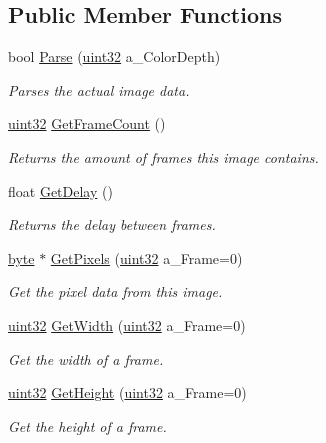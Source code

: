 \subsection*{Public Member Functions}
\begin{DoxyCompactItemize}
\item 
bool \hyperlink{classtil_1_1_image_g_i_f_a227eb60dcc93f3a9390ef3b5152d8dd4}{Parse} (\hyperlink{namespacetil_a20db61688ed403d11f057a508d87e54c}{uint32} a\_\-ColorDepth)
\begin{DoxyCompactList}\small\item\em Parses the actual image data. \item\end{DoxyCompactList}\item 
\hyperlink{namespacetil_a20db61688ed403d11f057a508d87e54c}{uint32} \hyperlink{classtil_1_1_image_g_i_f_a9e0c056b0263196d305c9102f254240e}{GetFrameCount} ()
\begin{DoxyCompactList}\small\item\em Returns the amount of frames this image contains. \item\end{DoxyCompactList}\item 
float \hyperlink{classtil_1_1_image_g_i_f_a01af14634200dbb109d124746764d05d}{GetDelay} ()
\begin{DoxyCompactList}\small\item\em Returns the delay between frames. \item\end{DoxyCompactList}\item 
\hyperlink{namespacetil_a5f3ec10aca1a788b495a0bd3787bc2dc}{byte} $\ast$ \hyperlink{classtil_1_1_image_g_i_f_ad9ee66121f0d4fe3a58af75177bb9245}{GetPixels} (\hyperlink{namespacetil_a20db61688ed403d11f057a508d87e54c}{uint32} a\_\-Frame=0)
\begin{DoxyCompactList}\small\item\em Get the pixel data from this image. \item\end{DoxyCompactList}\item 
\hyperlink{namespacetil_a20db61688ed403d11f057a508d87e54c}{uint32} \hyperlink{classtil_1_1_image_g_i_f_a368dce7e854e1eddad76242aac167161}{GetWidth} (\hyperlink{namespacetil_a20db61688ed403d11f057a508d87e54c}{uint32} a\_\-Frame=0)
\begin{DoxyCompactList}\small\item\em Get the width of a frame. \item\end{DoxyCompactList}\item 
\hyperlink{namespacetil_a20db61688ed403d11f057a508d87e54c}{uint32} \hyperlink{classtil_1_1_image_g_i_f_ac241e6cacaf14d1e73aae50f105450ae}{GetHeight} (\hyperlink{namespacetil_a20db61688ed403d11f057a508d87e54c}{uint32} a\_\-Frame=0)
\begin{DoxyCompactList}\small\item\em Get the height of a frame. \item\end{DoxyCompactList}\end{DoxyCompactItemize}
